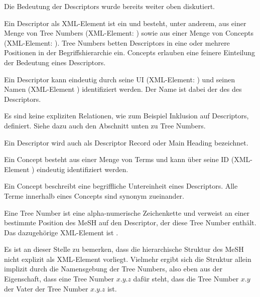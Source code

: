 Die Bedeutung der Descriptors wurde bereits weiter oben diskutiert.\par

Ein Descriptor als XML-Element ist ein  und besteht, unter anderem, aus einer Menge von Tree Numbers (XML-Element: ) sowie aus einer Menge von Concepts (XML-Element: ). Tree Numbers betten Descriptors in eine oder mehrere Positionen in der Begriffshierarchie ein. Concepts erlauben eine feinere Einteilung der Bedeutung eines Descriptors.\par

Ein Descriptor kann eindeutig durch seine UI (XML-Element: ) und seinen Namen (XML-Element ) identifiziert werden. Der Name ist dabei der   des  des Descriptors.\par

Es sind keine expliziten Relationen, wie zum Beispiel Inklusion auf Descriptors, definiert. Siehe dazu auch den Abschnitt unten zu Tree Numbers. \par

Ein Descriptor wird auch als Descriptor Record oder Main Heading bezeichnet.

Ein Concept besteht aus einer Menge von Terms und kann über seine ID (XML-Element ) eindeutig identifiziert werden. \par

Ein Concept beschreibt eine begriffliche Untereinheit eines Descriptors. Alle Terme innerhalb eines Concepts sind synonym zueinander. \par

Eine Tree Number ist eine alpha-numerische Zeichenkette und verweist an einer bestimmte Position des MeSH auf den Descriptor, der diese Tree Number enthält. Das dazugehörige XML-Element ist  . \par
Es ist an dieser Stelle zu bemerken, dass die hierarchische Struktur des MeSH nicht explizit als XML-Element vorliegt. Vielmehr ergibt sich die Struktur allein implizit durch die Namensgebung der Tree Numbers, also eben aus der Eigenschaft, dass eine Tree Number $x.y.z$ dafür steht, dass die Tree Number $x.y$ der Vater der Tree Number $x.y.z$ ist. \par

